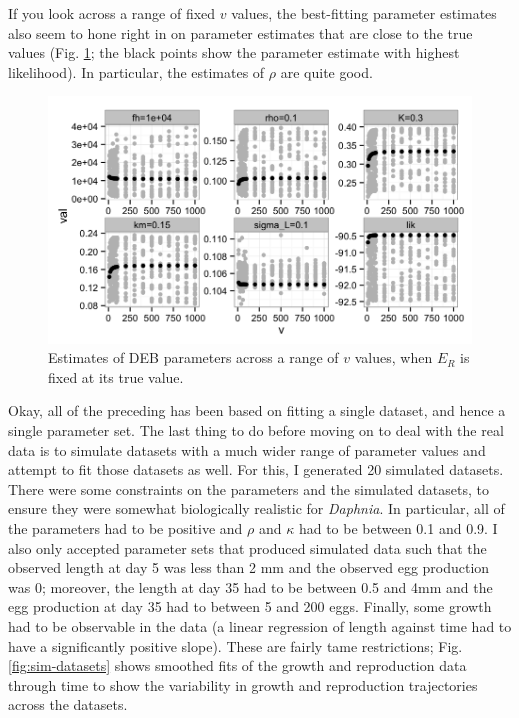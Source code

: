 \documentclass[12pt,reqno,final,pdftex]{amsart}\usepackage[]{graphicx}\usepackage[]{color}
\newenvironment{knitrout}{}{} %
\theoremstyle{plain}
\numberwithin{equation}{part}
\begin{document}
If you look across a range of fixed $v$ values, the best-fitting parameter estimates also seem to hone right in on parameter estimates that are close to the true values (Fig. \ref{fig:profile-lik-v-estimating-rho}; the black points show the parameter estimate with highest likelihood).
In particular, the estimates of $\rho$ are quite good.

\begin{knitrout}\scriptsize
{}\color{fgcolor}\begin{figure}

\includegraphics[width=\linewidth]{figure/profile-lik-v-estimating-rho-1} \hfill{}

\caption[Estimates of DEB parameters across a range of ]{Estimates of DEB parameters across a range of $v$ values, when $E_R$ is fixed at its true value.}\label{fig:profile-lik-v-estimating-rho}
\end{figure}


\end{knitrout}

Okay, all of the preceding has been based on fitting a single dataset, and hence a single parameter set.
The last thing to do before moving on to deal with the real data is to simulate datasets with a much wider range of parameter values and attempt to fit those datasets as well.
For this, I generated 20 simulated datasets.
There were some constraints on the parameters and the simulated datasets, to ensure they were somewhat biologically realistic for \emph{Daphnia}.
In particular, all of the parameters had to be positive and $\rho$ and $\kappa$ had to be between 0.1 and 0.9.
I also only accepted parameter sets that produced simulated data such that the observed length at day 5 was less than 2 mm and the observed egg production was 0; moreover, the length at day 35 had to be between 0.5 and 4mm and the egg production at day 35 had to between 5 and 200 eggs.
Finally, some growth had to be observable in the data (a linear regression of length against time had to have a significantly positive slope).
These are fairly tame restrictions; Fig. \ref{fig:sim-datasets} shows smoothed fits of the growth and reproduction data through time to show the variability in growth and reproduction trajectories across the datasets.
\end{document}
